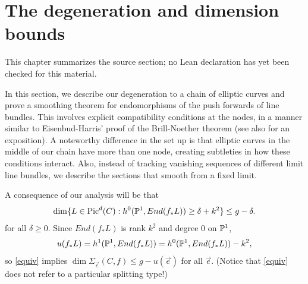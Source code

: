 \chapter{The degeneration and dimension bounds}
\label{refined-brill-noether-theory-hurwitz-spaces-chapter-03}

\begin{remark}
\label{refined-brill-noether-theory-hurwitz-spaces-chapter-03-source}
This chapter summarizes the source section; no Lean declaration has yet been
checked for this material.
\notready
\end{remark}

\label{dimbounds}
In this section, we describe our degeneration to a chain of elliptic curves and prove a smoothing theorem for endomorphisms of the push forwards of line bundles. This involves explicit compatibility conditions at the nodes, in a manner similar to Eisenbud-Harris' proof of the Brill-Noether theorem \cite{EH} (see also \cite[Ch. 5]{HM} for an exposition). A noteworthy difference in the set up is that elliptic curves in the middle of our chain have more than one node, creating subtleties in how these conditions interact.
Also, instead of tracking vanishing sequences of different limit line bundles, we describe the sections that smooth from a fixed limit.


 A consequence of our analysis will be that
\begin{equation} \label{equiv}\dcref{3.1}
\source{refined-brill-noether-theory-hurwitz-spaces}
\dim\{L \in \Pic^d(C) : h^0(\pp^1, End(f_*L)) \geq \delta+k^2\} \leq g - \delta.
\end{equation}
for all $\delta \geq 0$.
Since $End(f_*L)$ is rank $k^2$ and degree $0$ on $\mathbb{P}^1$,
\[u(f_*L) = h^1(\mathbb{P}^1, End(f_*L)) =  h^0(\mathbb{P}^1, End(f_*L)) - k^2,\]
so \eqref{equiv} implies $\dim \Sigma_{\vec{e}}(C, f) \leq g - u(\vec{e})$ for all $\vec{e}$.
(Notice that \eqref{equiv} does not refer to a particular splitting type!)

